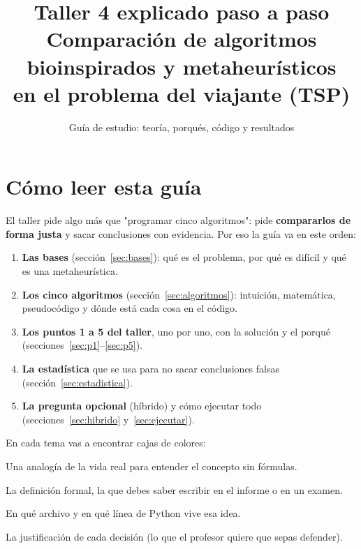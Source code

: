 \documentclass[11pt,a4paper]{article}
\title{\textbf{Taller 4 explicado paso a paso}\\[0.3em]
\large Comparación de algoritmos bioinspirados y metaheurísticos\\ en el problema del viajante (TSP)}
\author{Guía de estudio: teoría, porqués, código y resultados}
\date{}
\begin{document}
\maketitle
\tableofcontents
\newpage

\section{Cómo leer esta guía}
El taller pide algo más que "programar cinco algoritmos": pide \textbf{compararlos de forma justa}
y sacar conclusiones con evidencia. Por eso la guía va en este orden:

\begin{enumerate}
  \item \textbf{Las bases} (sección~\ref{sec:bases}): qué es el problema, por qué es difícil y qué es una metaheurística.
  \item \textbf{Los cinco algoritmos} (sección~\ref{sec:algoritmos}): intuición, matemática, pseudocódigo y dónde está cada cosa en el código.
  \item \textbf{Los puntos 1 a 5 del taller}, uno por uno, con la solución y el porqué (secciones~\ref{sec:p1}--\ref{sec:p5}).
  \item \textbf{La estadística} que se usa para no sacar conclusiones falsas (sección~\ref{sec:estadistica}).
  \item \textbf{La pregunta opcional} (híbrido) y cómo ejecutar todo (secciones~\ref{sec:hibrido} y~\ref{sec:ejecutar}).
\end{enumerate}

En cada tema vas a encontrar cajas de colores:

\begin{idea}
Una analogía de la vida real para entender el concepto sin fórmulas.
\end{idea}
\begin{mate}
La definición formal, la que debes saber escribir en el informe o en un examen.
\end{mate}
\begin{codigo}
En qué archivo y en qué línea de Python vive esa idea.
\end{codigo}
\begin{porque}
La justificación de cada decisión (lo que el profesor quiere que sepas defender).
\end{porque}
\end{document}
